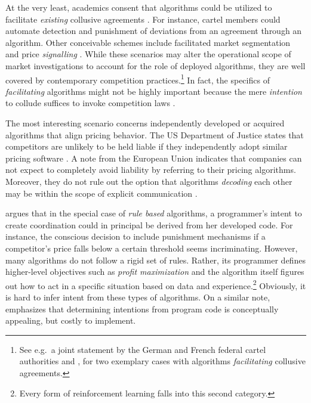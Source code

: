 At the very least, academics consent that algorithms could be utilized to facilitate \emph{existing} collusive agreements \parencite[p.219]{ezrachi_sustainable_2018}. For instance, cartel members could automate detection and punishment of deviations from an agreement through an algorithm. Other conceivable schemes include facilitated market segmentation and price \emph{signalling} \parencite[p.29]{oecd_price_2016}. While these scenarios may alter the operational scope of market investigations to account for the role of deployed algorithms, they are well covered by contemporary competition practices.\footnote{See e.g.\ a joint statement by the German and French federal cartel authorities \parencite{bundeskartellamt_working_nodate} and \textcite{cma_case_2016}, \textcite{oefgen_decision_2019} for two exemplary cases with algorithms \emph{facilitating} collusive agreements.} In fact, the specifics of \emph{facilitating} algorithms might not be highly important because the mere \emph{intention} to collude suffices to invoke competition laws \parencite[p.29]{bundeskartellamt_working_nodate}.

The most interesting scenario concerns independently developed or acquired algorithms that align pricing behavior. The US Department of Justice states that competitors are unlikely to be held liable if they independently adopt similar pricing software \parencite[p.6]{doj_algorithms_2017}. A note from the European Union indicates that companies can not expect to completely avoid liability by referring to their pricing algorithms. Moreover, they do not rule out the option that algorithms \emph{decoding} each other may be within the scope of explicit communication \parencite[p.8-9]{eu_algorithms_2017}. 

\textcite[pp.105-106]{gal_algorithms_2019} argues that in the special case of \emph{rule based} algorithms, a programmer's intent to create coordination could in principal be derived from her developed code. For instance, the conscious decision to include punishment mechanisms if a competitor's price falls below a certain threshold seems incriminating. However, many algorithms do not follow a rigid set of rules. Rather, its programmer defines higher-level objectives such as \emph{profit maximization} and the algorithm itself figures out how to act in a specific situation based on data and experience.\footnote{Every form of reinforcement learning falls into this second category.} Obviously, it is hard to infer intent from these types of algorithms. On a similar note, \textcite[p.350-351]{harrington_developing_2018} emphasizes that determining intentions from program code is conceptually appealing, but costly to implement.

